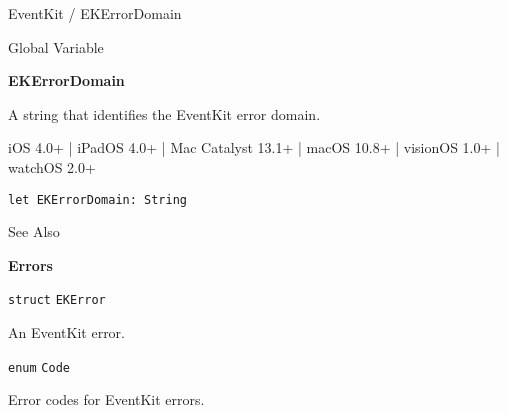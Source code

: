 \documentclass{article}
\title{}
\author{}
\date{}
\begin{document}
EventKit / EKErrorDomain

Global Variable

\textbf{EKErrorDomain}

A string that identifies the EventKit error domain.

iOS 4.0+ | iPadOS 4.0+ | Mac Catalyst 13.1+ | macOS 10.8+ | visionOS 1.0+ | watchOS 2.0+

\texttt{let EKErrorDomain: String}

See Also

\textbf{Errors}

\texttt{struct} \texttt{EKError}

An EventKit error.

\texttt{enum} \texttt{Code}

Error codes for EventKit errors.

\newpage
\end{document}

